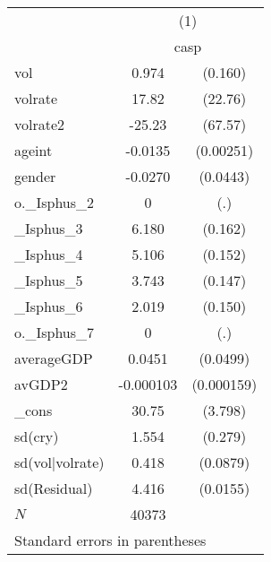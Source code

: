 \begin{tabular}{l*{1}{cc}} \hline\hline
             &\multicolumn{2}{c}{(1)}  \\
             &\multicolumn{2}{c}{casp} \\
\hline
vol          &       0.974&     (0.160)\\
volrate      &       17.82&     (22.76)\\
volrate2     &      -25.23&     (67.57)\\
ageint       &     -0.0135&   (0.00251)\\
gender       &     -0.0270&    (0.0443)\\
o.\_Isphus\_2  &           0&         (.)\\
\_Isphus\_3    &       6.180&     (0.162)\\
\_Isphus\_4    &       5.106&     (0.152)\\
\_Isphus\_5    &       3.743&     (0.147)\\
\_Isphus\_6    &       2.019&     (0.150)\\
o.\_Isphus\_7  &           0&         (.)\\
averageGDP   &      0.0451&    (0.0499)\\
avGDP2       &   -0.000103&  (0.000159)\\
\_cons       &       30.75&     (3.798)\\
sd(cry)      &       1.554&     (0.279)\\
sd(vol|volrate)&       0.418&    (0.0879)\\
sd(Residual) &       4.416&    (0.0155)\\
\hline
\(N\)        &       40373&            \\
\hline\hline
\multicolumn{3}{l}{\footnotesize Standard errors in parentheses}\\
\end{tabular}
